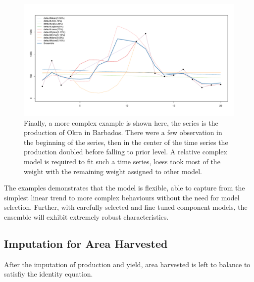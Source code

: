 \documentclass[nojss]{jss}\usepackage[]{graphicx}\usepackage[]{color}
\makeatletter
\def\maxwidth{ %
  \ifdim\Gin@nat@width>\linewidth
    \linewidth
  \else
    \Gin@nat@width
  \fi
}
\newenvironment{knitrout}{}{} %
\makeatother
\begin{document}
\begin{knitrout}
\color{fgcolor}\begin{figure}[!ht]


{\centering \includegraphics[width=\maxwidth]{figure/okra-barbados} 

}

\caption[Finally, a more complex example is shown here, the series is the production of Okra in Barbados]{Finally, a more complex example is shown here, the series is the production of Okra in Barbados. There were a few observation in the beginning of the series, then in the center of the time series the production doubled before falling to prior level. A relative complex model is required to fit such a time series, loess took most of the weight with the remaining weight assigned to other model.\label{fig:okra-barbados}}
\end{figure}


\end{knitrout}

\FloatBarrier

The examples demonstrates that the model is flexible, able to capture
from the simplest linear trend to more complex behaviours without the
need for model selection. Further, with carefully selected and fine
tuned component models, the ensemble will exhibit extremely robust
characteristics.


\FloatBarrier
\subsection{Imputation for Area Harvested}

After the imputation of production and yield, area harvested is left
to balance to satisfiy the identity equation.\\
\end{document}

